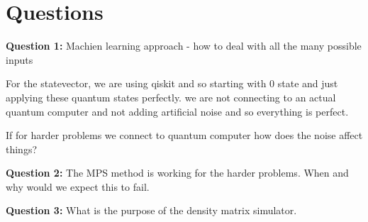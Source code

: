 \section{Questions}

\textbf{Question 1:} Machien learning approach - how to deal with all the many possible inputs

For the statevector, we are using qiskit and so starting with 0 state and just applying these quantum states perfectly. we are not connecting to an actual quantum computer and not adding artificial noise and so everything is perfect.

If for harder problems we connect to quantum computer how does the noise affect things?

\textbf{Question 2:} The MPS method is working for the harder problems. When and why would we expect this to fail.

\textbf{Question 3:} What is the purpose of the density matrix simulator.